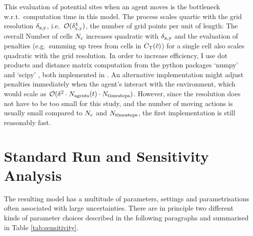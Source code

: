 This evaluation of potential sites when an agent moves is the bottleneck w.r.t.\ computation time in this model.
The process scales quartic with the grid resolution $\delta_{\rm x,y}$, i.e.\ $\mathcal{O}(\delta_{\rm x,y}^4)$, the number of grid points per unit of length: The overall Number of cells $N_{\rm c}$ increases quadratic with $\delta_{\rm x,y}$ and the evaluation of penalties (e.g.\ summing up trees from cells in $C_{\rm T}(\tilde{c})$) for a single cell also scales quadratic with the grid resolution.
In order to increase efficiency, I use dot products and distance matrix computation from the python packages `numpy' \citep{numpy} and `scipy' \citep{scipy}, both implemented in \CC.
An alternative implementation might adjust penalties immediately when the agent's interact with the environment, which would scale as $\mathcal{O}(\delta^2\cdot N_{\rm agents}(t)\cdot N_{\rm timesteps})$.
However, since the resolution does not have to be too small for this study, and the number of moving actions is usually small compared to $N_{\rm c}$ and $N_{\rm timesteps}$, the first implementation is still reasonably fast.
	
		
		
\section{Standard Run and Sensitivity Analysis}
The resulting model has a multitude of parameters, settings and parametrisations often associated with large uncertainties. 
There are in principle two different kinds of parameter choices described in the following paragraphs and summarised in Table \ref{tab:sensitivity}.

